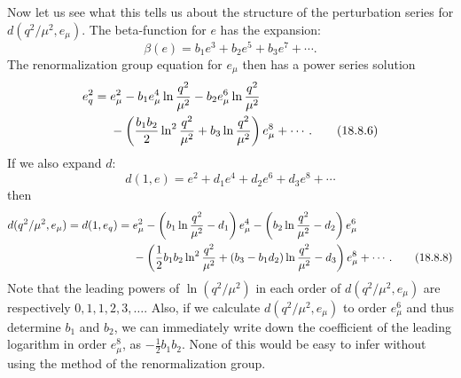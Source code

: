 Now let us see what this tells us about the structure of the perturbation series for $d(q^2/\mu^2,e_\mu)$. The beta-function for $e$ has the expansion:
\begin{equation}
\beta(e)=b_1e^3+b_2e^5+b_3e^7+\cdots.
\tag{18.8.5}\label{eq:18.8.5}
\end{equation}
The renormalization group equation for $e_\mu$ then has a power series solution
\begin{align}
e_q^2={}&e_\mu^2-b_1e_\mu^4\ln\frac{q^2}{\mu^2}
-b_2e_\mu^6\ln\frac{q^2}{\mu^2}
\notag\\
&-\left(\frac{b_1b_2}{2}\ln^2\frac{q^2}{\mu^2}
+b_3\ln\frac{q^2}{\mu^2}\right)e_\mu^8+\cdots.
\tag{18.8.6}\label{eq:18.8.6}
\end{align}
If we also expand $d$:
\begin{equation}
d(1,e)=e^2+d_1e^4+d_2e^6+d_3e^8+\cdots
\tag{18.8.7}\label{eq:18.8.7}
\end{equation}
then
\begin{align}
d(q^2/\mu^2,e_\mu)=d(1,e_q)={}&e_\mu^2
-\left(b_1\ln\frac{q^2}{\mu^2}-d_1\right)e_\mu^4
-\left(b_2\ln\frac{q^2}{\mu^2}-d_2\right)e_\mu^6
\notag\\
&-\left(\frac{1}{2}b_1b_2\ln^2\frac{q^2}{\mu^2}
+(b_3-b_1d_2)\ln\frac{q^2}{\mu^2}-d_3\right)e_\mu^8+\cdots.
\tag{18.8.8}\label{eq:18.8.8}
\end{align}
Note that the leading powers of $\ln(q^2/\mu^2)$ in each order of $d(q^2/\mu^2,e_\mu)$ are respectively $0,1,1,2,3,\ldots$. Also, if we calculate $d(q^2/\mu^2,e_\mu)$ to order $e_\mu^6$ and thus determine $b_1$ and $b_2$, we can immediately write down the coefficient of the leading logarithm in order $e_\mu^8$, as $-\tfrac12b_1b_2$. None of this would be easy to infer without using the method of the renormalization group.

